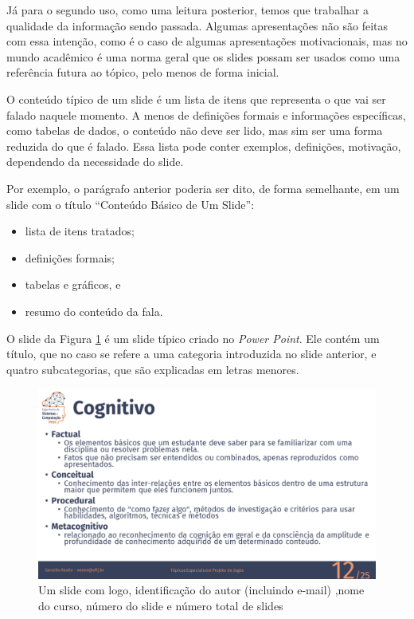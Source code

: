 Já para o segundo uso, como uma leitura posterior, temos que trabalhar a qualidade da informação sendo passada. Algumas apresentações não são feitas com essa intenção, como é o caso de algumas apresentações motivacionais, mas no mundo acadêmico é uma norma geral que os slides possam ser usados como uma referência futura ao tópico, pelo menos de forma inicial.

O conteúdo típico de um slide é um lista de itens  que representa o que vai ser falado naquele momento. A menos de definições formais e informações específicas, como tabelas de dados, o conteúdo não deve ser lido, mas sim ser uma forma reduzida do que é falado.  Essa lista pode conter exemplos, definições, motivação, dependendo da necessidade do slide.

Por exemplo, o parágrafo anterior poderia ser dito, de forma semelhante, em um slide com o título ``Conteúdo Básico de Um Slide'':
\begin{itemize}
    \item lista de itens tratados;
    \item definições formais;
    \item tabelas e gráficos, e
    \item resumo do conteúdo da fala.
\end{itemize}

O slide da Figura \ref{fig:coppe} é um slide típico criado no \textit{Power Point}. Ele contém um título, que no caso se refere a uma categoria introduzida no slide anterior, e quatro subcategorias, que são explicadas em letras menores.

\begin{figure}[htb]
    \centering
    \includegraphics[width=\tam\linewidth]{imagens/slideexemplotepj.png}
    \caption{Um slide com logo, identificação do autor (incluindo e-mail) ,nome do curso,   número do slide e número total de slides}
    \label{fig:coppe}
\end{figure}

